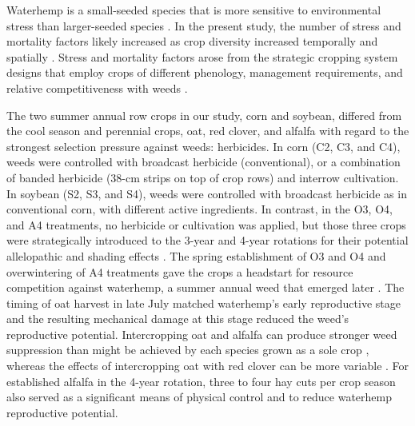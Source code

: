 \documentclass[
]{article}
\begin{document}
Waterhemp is a small-seeded species that is more sensitive to environmental stress than larger-seeded species \citep{harburLightGrowthRate2004}. In the present study, the number of stress and mortality factors likely increased as crop diversity increased temporally and spatially \citep{martinEffectCropRotation1993}. Stress and mortality factors arose from the strategic cropping system designs that employ crops of different phenology, management requirements, and relative competitiveness with weeds \citep{liebmanSustainableWeedManagement1990, liebmanCropRotationIntercropping1993}.

The two summer annual row crops in our study, corn and soybean, differed from the cool season and perennial crops, oat, red clover, and alfalfa with regard to the strongest selection pressure against weeds: herbicides. In corn (C2, C3, and C4), weeds were controlled with broadcast herbicide (conventional), or a combination of banded herbicide (38-cm strips on top of crop rows) and interrow cultivation. In soybean (S2, S3, and S4), weeds were controlled with broadcast herbicide as in conventional corn, with different active ingredients. In contrast, in the O3, O4, and A4 treatments, no herbicide or cultivation was applied, but those three crops were strategically introduced to the 3-year and 4-year rotations for their potential allelopathic and shading effects \citep{liebmanCropRotationIntercropping1993, singhAllelopathicInteractionsAllelochemicals2003}. The spring establishment of O3 and O4 and overwintering of A4 treatments gave the crops a headstart for resource competition against waterhemp, a summer annual weed that emerged later \citep{hartzlerEffectCommonWaterhemp2004}. The timing of oat harvest in late July matched waterhemp's early reproductive stage \citep{buhlerRelativeEmergenceSequence2008, horakGrowthAnalysisFour2000} and the resulting mechanical damage at this stage reduced the weed's reproductive potential. Intercropping oat and alfalfa can produce stronger weed suppression than might be achieved by each species grown as a sole crop \citep{laniniFightWeedsIncrease1992}, whereas the effects of intercropping oat with red clover can be more variable \citep{samsonChoiceManagementCover1990}. For established alfalfa in the 4-year rotation, three to four hay cuts per crop season also served as a significant means of physical control and to reduce waterhemp reproductive potential.
\end{document}

